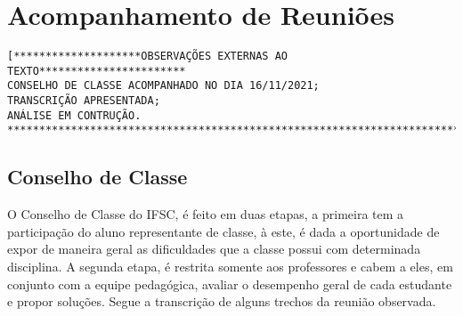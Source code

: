 \chapter{Acompanhamento de Reuniões}
\begin{verbatim}
[********************OBSERVAÇÕES EXTERNAS AO TEXTO***********************
CONSELHO DE CLASSE ACOMPANHADO NO DIA 16/11/2021;
TRANSCRIÇÃO APRESENTADA;
ANÁLISE EM CONTRUÇÃO.
*************************************************************************]
\end{verbatim}
\section{Conselho de Classe}

O Conselho de Classe do IFSC, é feito em duas etapas, a primeira tem a participação do aluno representante de classe, à este, é dada a oportunidade de expor de maneira geral as dificuldades que a classe possui com determinada disciplina. A segunda etapa, é restrita somente aos professores e cabem a eles, em conjunto com a equipe pedagógica, avaliar o desempenho geral de cada estudante e propor soluções. Segue a transcrição de alguns trechos da reunião observada.

